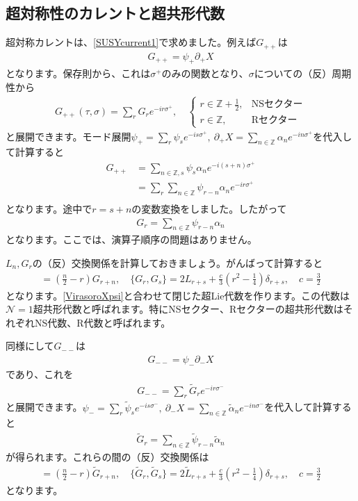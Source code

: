 \documentclass[report,paper=a4, fontsize=12pt, line_length=16cm, number_of_lines=34,dvipdfmx]{jlreq}
\numberwithin{equation}{chapter}
\numberwithin{equation}{section}
\newcommand{\Zb}{\mathbb{Z}}
\newcommand{\Ncal}{\mathcal{N}}
\newcommand{\del}{\partial}
\newcommand{\alphat}{\tilde{\alpha}}
\newcommand{\Lt}{\widetilde{L}}
\newcommand{\Gt}{\widetilde{G}}
\newcommand{\psit}{\tilde{\psi}}
\begin{document}
\subsection{超対称性のカレントと超共形代数}
超対称カレントは、\eqref{SUSYcurrent1}で求めました。例えば$G_{++}$は
\begin{align}
  G_{++}=\psi_{+}\del_{+}X
\end{align}
となります。保存則から、これは$\sigma^{+}$のみの関数となり、$\sigma$についての（反）周期性から
\begin{align}
  G_{++}(\tau,\sigma)=\sum_{r}G_{r}e^{-ir\sigma^{+}},\quad
  \begin{cases}
    r\in \Zb+\frac12,&\text{NSセクター}\\
    r\in \Zb,&\text{Rセクター}
  \end{cases}
\end{align}
と展開できます。モード展開$\psi_{+}=\sum_{r}\psi_{s}e^{-is\sigma^{+}},\ \del_{+}X=\sum_{n\in\Zb}\alpha_{n}e^{-in\sigma^{+}}$を代入して計算すると
\begin{align}
  G_{++}
  &=\sum_{n\in\Zb, s}\psi_{s}\alpha_{n}
  e^{-i(s+n)\sigma^{+}}\nonumber\\
  &=\sum_{r}\sum_{n\in\Zb}\psi_{r-n}\alpha_{n}
  e^{-ir\sigma^{+}}\nonumber\\
\end{align}
となります。途中で$r=s+n$の変数変換をしました。したがって
\begin{align}
  G_{r}=\sum_{n\in\Zb}\psi_{r-n}\alpha_{n}
\end{align}
となります。ここでは、演算子順序の問題はありません。

$L_n,G_r$の（反）交換関係を計算しておきましょう。がんばって計算すると
\begin{align}
  [L_n,G_r]=\left( \frac{n}{2} -r\right)G_{r+n},\quad
  \{G_r,G_s\}=2L_{r+s}+\frac{c}{3}\left( r^2-\frac{1}{4} \right)\delta_{r+s},\quad
  c=\frac{3}{2}
  \label{SCA}
\end{align}
となります。\eqref{VirasoroXpsi}と合わせて閉じた超Lie代数を作ります。この代数は$\Ncal=1$超共形代数と呼ばれます。特にNSセクター、Rセクターの超共形代数はそれぞれNS代数、R代数と呼ばれます。

同様にして$G_{--}$は
\begin{align}
  G_{--}=\psi_{-}\del_{-}X
\end{align}
であり、これを
\begin{align}
  G_{--}=\sum_{r}\Gt_{r}e^{-ir\sigma^{-}}
\end{align}
と展開できます。$\psi_{-}=\sum_{r}\psit_{s}e^{-is\sigma^{-}},\ \del_{-}X=\sum_{n\in\Zb}\alphat_{n}e^{-in\sigma^{-}}$を代入して計算すると
\begin{align}
  \Gt_{r}=\sum_{n\in\Zb}\psit_{r-n}\alphat_{n}
\end{align}
が得られます。これらの間の（反）交換関係は
\begin{align}
  [\Lt_n,\Gt_r]=\left( \frac{n}{2} -r\right)\Gt_{r+n},\quad
  \{\Gt_r,\Gt_s\}=2\Lt_{r+s}+\frac{c}{3}\left( r^2-\frac{1}{4} \right)\delta_{r+s},\quad
  c=\frac{3}{2}
\end{align}
となります。
\end{document}
